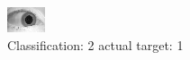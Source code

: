 \begin{figure}[h!]
\begin{center}
\includegraphics[width=0.60\columnwidth]{figures/ID1545_class_2_target_1.png}
\end{center}
\caption{ Classification: 2 actual target: 1}
\label{fig:ID1545_class_2_target_1}
\end{figure}
